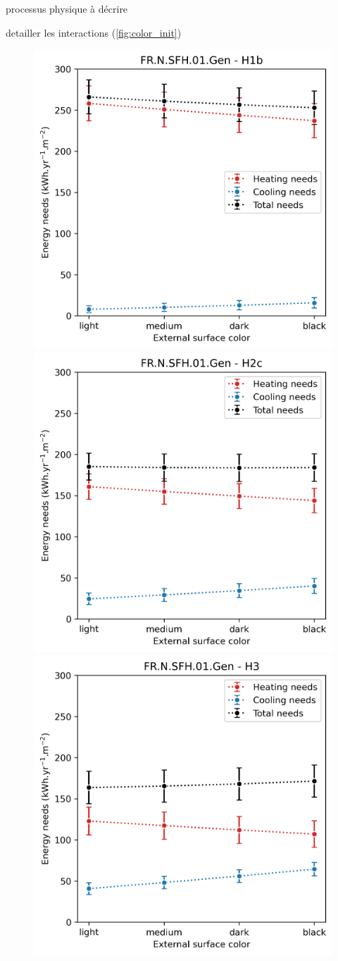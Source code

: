 \documentclass[11pt]{article}
\begin{document}
            processus physique à décrire

            detailler les interactions (\ref{fig:color_init})

            \begin{figure}[ht]
                \centering
                \includegraphics[width=0.32\columnwidth]{figures/albedo_FR.N.SFH.01.Gen_H1b_conventionnel_th-bce_2020_2000-2020.png}
                \includegraphics[width=0.32\columnwidth]{figures/albedo_FR.N.SFH.01.Gen_H2c_conventionnel_th-bce_2020_2000-2020.png}
                \includegraphics[width=0.32\columnwidth]{figures/albedo_FR.N.SFH.01.Gen_H3_conventionnel_th-bce_2020_2000-2020.png}\\

\end{figure}
\end{document}
